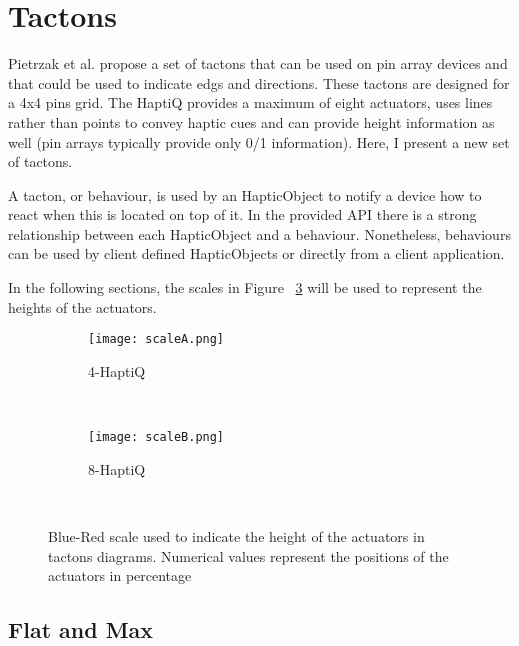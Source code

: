 \section{Tactons}

Pietrzak et al. \cite{pietrzak2009creating} propose a set of tactons that can be used on pin array devices and that could be used to indicate edgs and directions. These tactons are designed for a 4x4 pins grid. The HaptiQ provides a maximum of eight actuators, uses lines rather than points to convey haptic cues and can provide height information as well (pin arrays typically provide only 0/1 information). Here, I present a new set of tactons.

A tacton, or behaviour, is used by an HapticObject to notify a device how to react when this is located on top of it. In the provided API there is a strong relationship between each HapticObject and a behaviour. Nonetheless, behaviours can be used by client defined HapticObjects or directly from a client application.

In the following sections, the scales in Figure ~\ref{fig:scales} will be used to represent the heights of the actuators.

\begin{figure}[H]
        \centering
        \begin{subfigure}[H]{0.7\textwidth}
                \texttt{[image: scaleA.png]}
                \caption{4-HaptiQ}
                \label{fig:scale-4}
        \end{subfigure}%
        ~ %
          
        \begin{subfigure}[H]{0.7\textwidth}
                \texttt{[image: scaleB.png]}
                \caption{8-HaptiQ}
                \label{fig:scale-8}
        \end{subfigure}
        ~ %
        \caption{Blue-Red scale used to indicate the height of the actuators in tactons diagrams. Numerical values represent the positions of the actuators in percentage}
        \label{fig:scales}
\end{figure}

\subsection{Flat and Max}

